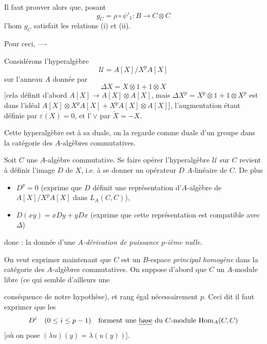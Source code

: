 \documentclass[11pt,a4paper]{article}
\begin{document}

Il faut prouver alors que, posant
\[
g_C = \rho \circ \psi'_1 : B \longrightarrow C \otimes C
\]
l'hom $g_C$ satisfait les relations (i) et (ii).

Pour ceci, ----


Considérons l'hyperalgèbre
\[
\mathcal{U} = A[X] / X^p A[X]
\]
sur l'anneau $A$   donnée par
\[
\boxed{\ \Delta X = X \otimes 1 + 1 \otimes X\ }
\]
[cela définit d'abord $A[X] \to A[X] \otimes A[X]$, mais
$\Delta X^p = X^p \otimes 1 + 1 \otimes X^p$ est  dans
l'idéal $A[X] \otimes X^p A[X] + X^p A[X] \otimes A[X]$], l'augmentation
étant définie par \struck{\ill{}} $\boxed{\varepsilon(X) = 0}$, et
l'\,$\vee$ par $\boxed{\check{X} = -X}$.

Cette hyperalgèbre est  à sa duale,  on la regarde comme  duale d'un
groupe dans la catégorie des $A$-algèbres commutatives.

Soit $C$ une $A$-algèbre commutative. Se faire opérer l'hyperalgèbre
$\mathcal{U}$ sur $C$ revient à définir l'image $D$ de $X$, i.e. à se
donner un opérateur $D$ $A$-linéaire de $C$. De plus
\begin{itemize}
  \item[(i)] $D^p = 0$ (exprime que $D$ définit une représentation
  d'$A$-algèbre de $A[X]/X^p A[X]$ dans $L_A(C, C)$),
  \item[(ii)] $D(xy) = x Dy + y Dx$ (exprime que cette représentation est
  compatible avec $\Delta$)
\end{itemize}
donc \ill{}  : la donnée d'une \emph{$A$-dérivation de
puissance $p$-ième nulle}.

On veut exprimer maintenant que $C$ est un $B$-espace
\emph{principal homogène} dans la catégorie des $A$-algèbres commutatives.
On suppose d'abord  que $C$ \struck{\ill{}}  un $A$-module libre (ce qui semble d'ailleurs une


conséquence de notre hypothèse), et \struck{\ill{}} rang égal nécessairement
$p$. Ceci dit il faut exprimer que les
\[
D^i \quad (0 \leq i \leq p-1) \quad \text{forment une \emph{base} du $C$-module } \mathrm{Hom}_A(C, C)
\]
[où on pose $(\lambda u)(y) = \lambda(u(y))$].
\end{document}
